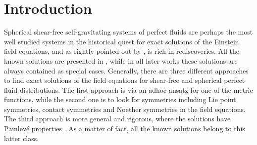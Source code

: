 \documentclass[abstract=on,notitlepage,superscriptaddress,nofootinbib,aps,preprint,prd]{revtex4}
\newcommand{\0}{^{(0)}}
\newcommand{\1}{^{(1)}}
\newcommand{\2}{^{(2)}}
\newcommand{\3}{{}^{(3)}}
\begin{document}


\maketitle




\section{Introduction}
 
Spherical shear-free self-gravitating systems of perfect fluids are perhaps the most well studied systems in the historical quest for exact solutions of the Einstein field equations, and as rightly pointed out by \cite{exact}, is rich in rediscoveries. All the known solutions are presented in \cite{McVittie, Kustaan, Wyman}, while in all later works these solutions are always contained as special cases. Generally, there are three different approaches to find exact solutions of the field equations for shear-free and spherical perfect fluid distributions. The first approach is via an adhoc ansatz for one of the metric functions, while the second one is to look for symmetries including Lie point symmetries, contact symmetries and Noether symmetries in the field equations. The third approach is more general and rigorous, where the solutions have Painlev\'{e} properties \cite{Wyman}. As a matter of fact, all the known solutions belong to this latter class. 
\end{document}

